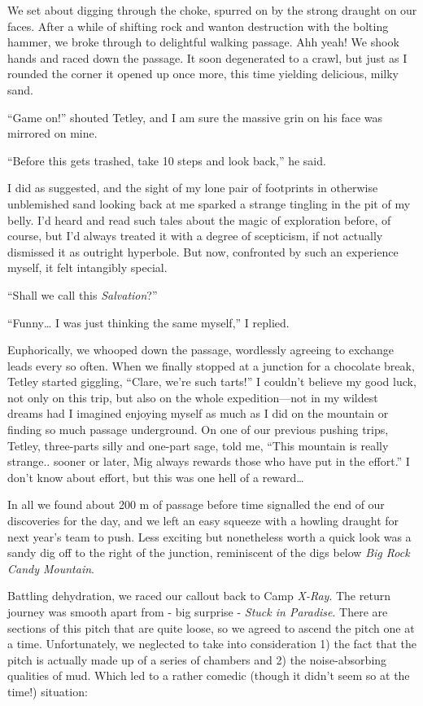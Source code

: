 We set about digging through the choke, spurred on by the strong draught
on our faces. After a while of shifting rock and wanton destruction with
the bolting hammer, we broke through to delightful walking passage. Ahh
yeah! We shook hands and raced down the passage. It soon degenerated to
a crawl, but just as I rounded the corner it opened up once more, this
time yielding delicious, milky sand.

``Game on!'' shouted Tetley, and I am sure the massive grin on his face
was mirrored on mine.

``Before this gets trashed, take 10 steps and look back,'' he said.

I did as suggested, and the sight of my lone pair of footprints in
otherwise unblemished sand looking back at me sparked a strange tingling
in the pit of my belly. I'd heard and read such tales about the magic of
exploration before, of course, but I'd always treated it with a degree
of scepticism, if not actually dismissed it as outright hyperbole. But
now, confronted by such an experience myself, it felt intangibly
special.

``Shall we call this \emph{Salvation}?''

``Funny\ldots{} I was just thinking the same myself,'' I replied.

Euphorically, we whooped down the passage, wordlessly agreeing to
exchange leads every so often. When we finally stopped at a junction for
a chocolate break, Tetley started giggling, ``Clare, we're such tarts!''
I couldn't believe my good luck, not only on this trip, but also on the
whole expedition---not in my wildest dreams had I imagined enjoying
myself as much as I did on the mountain or finding so much passage
underground. On one of our previous pushing trips, Tetley, three-parts
silly and one-part sage, told me, ``This mountain is really strange..
sooner or later, Mig always rewards those who have put in the effort.''
I don't know about effort, but this was one hell of a reward\ldots{}

In all we found about 200 m of passage before time signalled the end of
our discoveries for the day, and we left an easy squeeze with a howling
draught for next year's team to push. Less exciting but nonetheless
worth a quick look was a sandy dig off to the right of the junction,
reminiscent of the digs below \emph{Big Rock Candy Mountain}.

Battling dehydration, we raced our callout back to Camp \emph{X-Ray}.
The return journey was smooth apart from - big surprise - \emph{Stuck in
Paradise}. There are sections of this pitch that are quite loose, so we
agreed to ascend the pitch one at a time. Unfortunately, we neglected to
take into consideration 1) the fact that the pitch is actually made up
of a series of chambers and 2) the noise-absorbing qualities of mud.
Which led to a rather comedic (though it didn't seem so at the time!)
situation:

